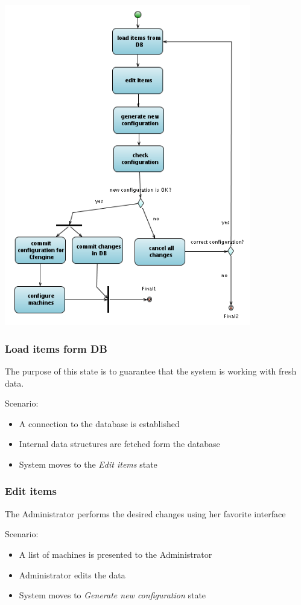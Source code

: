 \documentclass[12pt]{article}
\begin{document}
\includegraphics[height=14cm]{business_process.png}

\subsubsection{Load items form DB}
The purpose of this state is to guarantee that the system is working with fresh
data.

Scenario:
\begin{itemize}
    \item{A connection to the database is established}
    \item{Internal data structures are fetched form the database}
    \item{System moves to the {\em Edit items} state}
\end{itemize}

\subsubsection{Edit items}
The Administrator performs the desired changes using her favorite interface

Scenario:
\begin{itemize}
    \item{A list of machines is presented to the Administrator}
    \item{Administrator edits the data}
    \item{System moves to {\em Generate new configuration} state}
\end{itemize}
\end{document}
